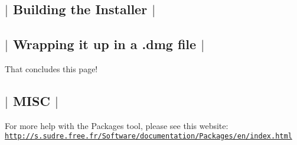  \subsection*{$\vert$ Building the Installer $\vert$ }



 \subsection*{$\vert$ Wrapping it up in a .dmg file $\vert$ }

That concludes this page!



 \subsection*{$\vert$ M\-I\-S\-C $\vert$ }

For more help with the Packages tool, please see this website\-: \href{http://s.sudre.free.fr/Software/documentation/Packages/en/index.html}{\tt http\-://s.\-sudre.\-free.\-fr/\-Software/documentation/\-Packages/en/index.\-html} 